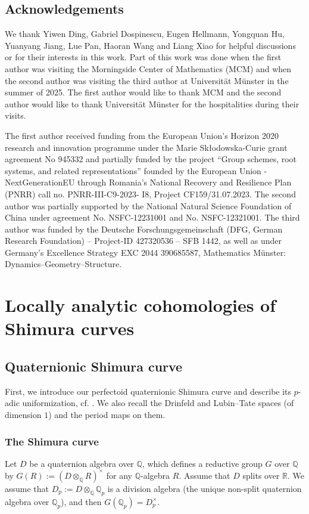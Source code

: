 \documentclass{article}
\theoremstyle{definition}
\def\bbQ{\mathbb{Q}}
\def\bbR{\mathbb{R}}
\DeclareMathOperator{\ox}{\otimes}
\begin{document}
\subsection*{Acknowledgements}
We thank Yiwen Ding, Gabriel Dospinescu, Eugen Hellmann, Yongquan Hu, Yuanyang Jiang, Lue Pan, Haoran Wang and Liang Xiao for helpful discussions or for their interests in this work. Part of this work was done when the first author was visiting the Morningside Center of Mathematics (MCM) and when the second author was visiting the third author at Universität Münster in the summer of 2025. The first author would like to thank MCM and the second author would like to thank Universität Münster for the hospitalities during their visits.

The first author received funding from the European Union's Horizon 2020 research and innovation programme under the Marie Skłodowska-Curie grant agreement No 945332 and partially funded by the project “Group schemes, root systems, and related representations” founded by the European Union - NextGenerationEU through Romania’s National Recovery and Resilience Plan (PNRR) call no. PNRR-III-C9-2023- I8, Project CF159/31.07.2023. The second author was partially supported by the National Natural Science Foundation of China under agreement No. NSFC-12231001 and No. NSFC-12321001. The third author was funded by the Deutsche Forschungsgemeinschaft (DFG, German Research Foundation) – Project-ID 427320536 – SFB 1442, as well as under Germany's Excellence Strategy EXC 2044 390685587, Mathematics Münster: Dynamics–Geometry–Structure.
\section{Locally analytic cohomologies of Shimura curves}
\subsection{Quaternionic Shimura curve}\label{sec:quaternionicshimuracurve} First, we introduce our perfectoid quaternionic Shimura curve and describe its $p$-adic uniformization, cf. \cite[\S 5, \S 6]{Scholze2018LubinTate}. We also recall the Drinfeld and Lubin--Tate spaces (of dimension $1$) and the period maps on them.
\subsubsection{The Shimura curve}\label{subsec:quaternionicshimuracurve}
Let $D$ be a quaternion algebra over $\bbQ$, which defines a reductive group $G$ over $\bbQ$ by $G(R):=(D\ox_{\bbQ}R)^\times$ for any $\bbQ$-algebra $R$. Assume that $D$ splits over $\bbR$. We assume that $D_p:=D\ox_{\bbQ} \bbQ_p$ is a division algebra (the unique non-split quaternion algebra over $\bbQ_p$), and then $G(\bbQ_p)=D_p^{\times}$. 
\end{document}
